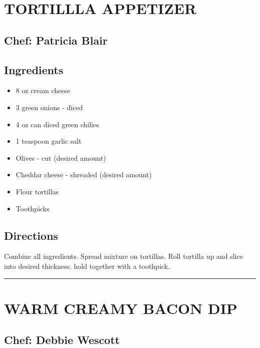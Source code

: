 \documentclass[
]{book}
\providecommand{\tightlist}{%
  \setlength{\itemsep}{0pt}\setlength{\parskip}{0pt}}
\begin{document}
\hypertarget{tortillla-appetizer}{%
\section*{TORTILLLA APPETIZER}\label{tortillla-appetizer}}


\hypertarget{chef-patricia-blair-3}{%
\subsection*{Chef: Patricia Blair}\label{chef-patricia-blair-3}}


\hypertarget{ingredients-10}{%
\subsection*{Ingredients}\label{ingredients-10}}


\begin{itemize}
\tightlist
\item
  8 oz cream cheese
\item
  3 green onions - diced
\item
  4 oz can diced green chilies
\item
  1 teaspoon garlic salt
\item
  Olives - cut (desired amount)
\item
  Cheddar cheese - shreaded (desired amount)
\item
  Flour tortillas
\item
  Toothpicks
\end{itemize}

\hypertarget{directions-10}{%
\subsection*{Directions}\label{directions-10}}


Combine all ingredients. Spread mixture on tortillas. Roll tortilla up and slice into desired thickness.
hold together with a toothpick.

\begin{center}\rule{0.5\linewidth}{0.5pt}\end{center}

\hypertarget{warm-creamy-bacon-dip}{%
\section*{WARM CREAMY BACON DIP}\label{warm-creamy-bacon-dip}}


\hypertarget{chef-debbie-wescott-1}{%
\subsection*{Chef: Debbie Wescott}\label{chef-debbie-wescott-1}}
\end{document}

